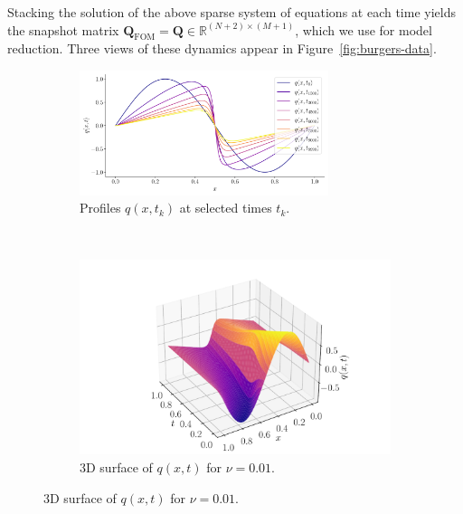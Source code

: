 Stacking the solution of the above sparse system of equations at each time yields the snapshot matrix $\mathbf{Q}_{\mathrm{FOM}} = \mathbf{Q}\in\mathbb{R}^{(N+2)\times(M+1)}$, which we use for model reduction.  Three views of these dynamics appear in Figure~\ref{fig:burgers-data}.

\vspace{0.3cm}

\begin{figure}[h!]
  \centering
  \begin{subfigure}[t]{\textwidth}
    \centering
    \includegraphics[width=0.8\textwidth]{figures/burgers_evol_001.pdf}
    \caption{Profiles \(q(x,t_k)\) at selected times \(t_k\).}
    \label{fig:burgers-surface}
  \end{subfigure}
  \\[1em]
  \begin{subfigure}[t]{0.56\textwidth}
    \centering
    \hspace{-1.5cm}
    \includegraphics[width=\textwidth]{figures/burgers_sol_001.pdf}
    \caption{3D surface of \(q(x,t)\) for \(\nu=0.01\).}
    \label{fig:burgers-slices}
  \end{subfigure}
  \hspace{-1.5cm}

\end{figure}
